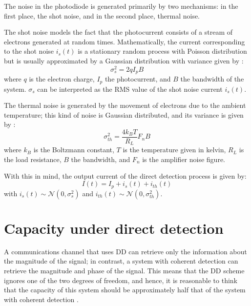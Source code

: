 The noise in the photodiode is generated primarily by two mechanisms: in the first place, the shot noise, and in the second place, thermal noise.

The shot noise models the fact that the photocurrent consists of a stream of electrons generated at random times. Mathematically, the current corresponding to the shot noise $i_s(t)$ is a stationary random process with Poisson distribution but is usually approximated by a Gaussian distribution with variance given by \cite{Agrawal_ch4}:
\begin{equation}
\sigma_s^2 = 2qI_pB
\label{eq:shot_noise_varaince}
\end{equation}%
%
where $q$ is the electron charge, $I_p$ the photocurrent, and $B$ the bandwidth of the system. $\sigma_s$ can be interpreted as the RMS value of the shot noise current $i_s(t)$.

The thermal noise is generated by the movement  of electrons due to the ambient temperature; this kind of noise is Gaussian distributed, and its variance  is given by \cite{Agrawal_ch4}:
\begin{equation}
\sigma_{th}^2 = \frac{4k_BT}{R_L} F_nB
\label{eq:thermal_noise_variance}
\end{equation}%
%
where $k_B$ is the Boltzmann constant, $T$ is the temperature given in kelvin, $R_L$ is the load resistance, $B$ the bandwidth, and $F_n$ is the amplifier noise figure. 

With this in mind, the output current of the direct detection process is given by:
\begin{equation}
I(t) = I_p+i_s(t)+i_{th}(t)
\label{eq:DD_current}
\end{equation}
with $i_s(t)\sim\mathcal{N}(0,\sigma_s^2)$ and $i_{th}(t)\sim\mathcal{N}(0,\sigma_{th}^2)$.



\section{Capacity under direct detection}
\label{sec:capacity_under_direct_detection}

A communications channel that uses DD can retrieve only the information about the magnitude of the signal; in contrast, a system with coherent detection can retrieve the magnitude and phase of the signal. This means that the DD scheme ignores one of the two degrees of freedom, and hence, it is reasonable to think that the capacity of this system should be approximately half that of the system with coherent detection \cite{Mecozzi_2018, Tasbihi_Tukey, Tasbihi_Capacity}.

